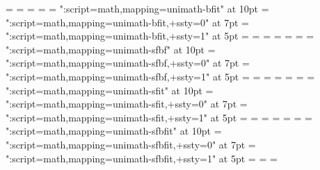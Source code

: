 \scriptscriptfont \mttfam =  \fivemtt
\def\mtt{\fam\mttfam}
\newfam\textttfam
\textfont         \textttfam =   \tentt
\scriptfont       \textttfam = \seventt
\scriptscriptfont \textttfam =  \fivett
\def\tt{\fam\textttfam\tentt}
\newfam\mbfitfam
\font  \tenmbfit = "\mathalphafontname:script=math,mapping=unimath-bfit" at 10pt
\font\sevenmbfit = "\mathalphafontname:script=math,mapping=unimath-bfit,+ssty=0" at 7pt
\font \fivembfit = "\mathalphafontname:script=math,mapping=unimath-bfit,+ssty=1" at 5pt
\textfont         \mbfitfam =   \tenmbfit
\scriptfont       \mbfitfam = \sevenmbfit
\scriptscriptfont \mbfitfam =  \fivembfit
\def\mbfit{\fam\mbfitfam}
\newfam\textbfitfam
\textfont         \textbfitfam =   \tenbfit
\scriptfont       \textbfitfam = \sevenbfit
\scriptscriptfont \textbfitfam =  \fivebfit
\def\bfit{\fam\textbfitfam\tenbfit}
\newfam\msfbffam
\font  \tenmsfbf = "\mathalphafontname:script=math,mapping=unimath-sfbf" at 10pt
\font\sevenmsfbf = "\mathalphafontname:script=math,mapping=unimath-sfbf,+ssty=0" at 7pt
\font \fivemsfbf = "\mathalphafontname:script=math,mapping=unimath-sfbf,+ssty=1" at 5pt
\textfont         \msfbffam =   \tenmsfbf
\scriptfont       \msfbffam = \sevenmsfbf
\scriptscriptfont \msfbffam =  \fivemsfbf
\def\msfbf{\fam\msfbffam}
\newfam\textsfbffam
\textfont         \textsfbffam =   \tensfbf
\scriptfont       \textsfbffam = \sevensfbf
\scriptscriptfont \textsfbffam =  \fivesfbf
\def\sfbf{\fam\textsfbffam\tensfbf}
\newfam\msfitfam
\font  \tenmsfit = "\mathalphafontname:script=math,mapping=unimath-sfit" at 10pt
\font\sevenmsfit = "\mathalphafontname:script=math,mapping=unimath-sfit,+ssty=0" at 7pt
\font \fivemsfit = "\mathalphafontname:script=math,mapping=unimath-sfit,+ssty=1" at 5pt
\textfont         \msfitfam =   \tenmsfit
\scriptfont       \msfitfam = \sevenmsfit
\scriptscriptfont \msfitfam =  \fivemsfit
\def\msfit{\fam\msfitfam}
\newfam\textsfitfam
\textfont         \textsfitfam =   \tensfit
\scriptfont       \textsfitfam = \sevensfit
\scriptscriptfont \textsfitfam =  \fivesfit
\def\sfit{\fam\textsfitfam\tensfit}
\newfam\msfbfitfam
\font  \tenmsfbfit = "\mathalphafontname:script=math,mapping=unimath-sfbfit" at 10pt
\font\sevenmsfbfit = "\mathalphafontname:script=math,mapping=unimath-sfbfit,+ssty=0" at 7pt
\font \fivemsfbfit = "\mathalphafontname:script=math,mapping=unimath-sfbfit,+ssty=1" at 5pt
\textfont         \msfbfitfam =   \tenmsfbfit
\scriptfont       \msfbfitfam = \sevenmsfbfit
\scriptscriptfont \msfbfitfam =  \fivemsfbfit
\def\msfbfit{\fam\msfbfitfam}
